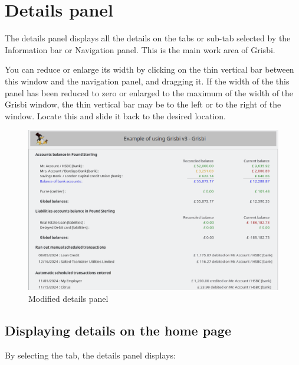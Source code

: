 \section{Details panel\label{home-details}}

The details panel displays all the details on the tabs or sub-tab selected by the Information bar or Navigation panel. This is the main work area of Grisbi.

You can reduce or enlarge its width by clicking on the thin vertical bar between this window and the navigation panel, and dragging it. If the width of the this panel has been reduced to zero or enlarged to the maximum of the width of the Grisbi window, the thin vertical bar may be to the left or to the right of the window. Locate this and slide it back to the desired location.

\begin{figure}[htbp]			%
	\begin{center}
	\includegraphics[width=1\textwidth]{image/screenshot/home_details.png}
	\end{center}
	\caption{Modified details panel}		%
	\label{home_details}
\end{figure}

\subsection{Displaying details on the home page\label{home-details-homepage}}

By selecting the  tab, the details panel displays:

